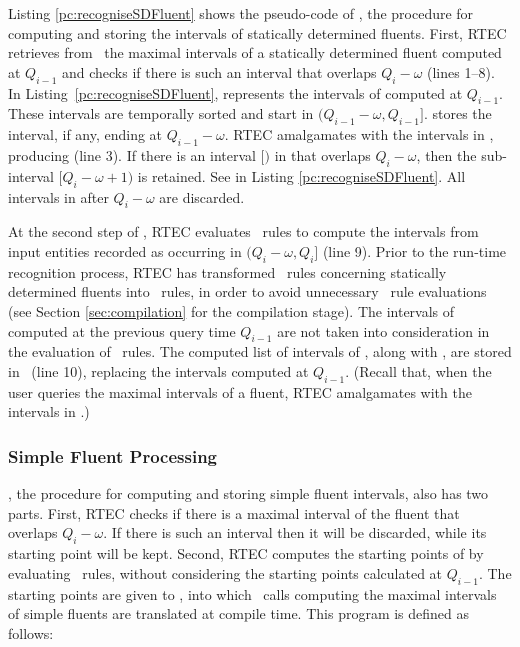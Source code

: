 Listing \ref{pc:recogniseSDFluent} shows the pseudo-code of \processSDFluent, the procedure for computing and storing the intervals of statically determined fluents. First, RTEC retrieves from \sdFPList\ the maximal intervals of a statically determined fluent  computed at $Q_{i{-}1}$ and checks if there is such an interval that overlaps $Q_i{-}\omega$ (lines 1--8). In Listing~\ref{pc:recogniseSDFluent},  represents the intervals of  computed at $Q_{i-1}$. These intervals are temporally sorted and start in $(Q_{i-1}{-}\omega, Q_{i-1}]$.  stores the interval, if any, ending at $Q_{i-1}{-}\omega$. RTEC amalgamates  with the intervals in , producing  (line 3). If there is an interval  $[$$)$ in  that overlaps $Q_i{-}\omega$, then the sub-interval $[$$\mathit{Q_i{-}\omega{+}1)}$ is retained. See  in Listing \ref{pc:recogniseSDFluent}. All intervals in  after $Q_i{-}\omega$ are discarded.

At the second step of \processSDFluent, RTEC evaluates \holdsForSDFluent\ rules to compute the  intervals from input entities recorded as occurring in $(Q_i{-}\omega, Q_i]$ (line 9). Prior to the run-time recognition process, RTEC has transformed \holdsFor\ rules concerning statically determined fluents into \holdsForSDFluent\ rules, in order to avoid unnecessary \holdsFor\ rule evaluations (see Section \ref{sec:compilation} for the compilation stage). The intervals of  computed at the previous query time $Q_{i-1}$ are not taken into consideration in the evaluation of \holdsForSDFluent\ rules. The computed list of intervals  of , along with , are stored in \sdFPList\ (line 10), replacing the intervals computed at $Q_{i-1}$. (Recall that, when the user queries the maximal intervals of a fluent, RTEC amalgamates  with the intervals in .)



\subsubsection{Simple Fluent Processing}

\processSimpleFluent, the procedure for computing and storing simple fluent intervals, also has two parts. First, RTEC checks if there is a maximal interval of the fluent  that overlaps $Q_i{-}\omega$. If there is such an interval then it will be discarded, while its starting point will be kept. 
Second, RTEC computes the starting points of  by evaluating \initiatedAt\ rules, without considering the starting points calculated at $Q_{i-1}$. The starting points are given to \holdsForSimpleFluent, into which \holdsFor\ calls computing the maximal intervals of simple fluents are translated at compile time. This program is defined as follows:

